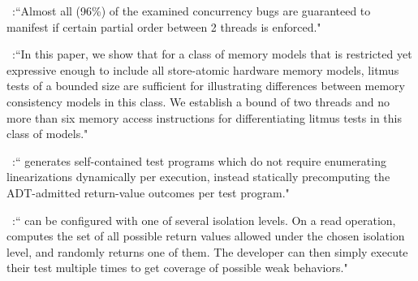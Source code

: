 ~\cite{Mistakes:ASPLOS2008}:``Almost all (96\%) of the examined concurrency bugs 
are guaranteed to manifest 
if certain partial order between 2 threads is enforced."

~\cite{Bounds:DAC2011}:``In this paper, we show that for a class of memory models 
that is restricted yet expressive enough
to include all store-atomic hardware memory models, 
litmus tests of a bounded size are sufficient for 
illustrating differences between memory consistency models in this class.
We establish a bound of two threads and 
no more than six memory access instructions 
for differentiating litmus tests
in this class of models."

\violat~\cite{Violat:CAV2019}:``\violat{} generates self-contained test programs which do
not require enumerating linearizations dynamically per execution, instead statically
precomputing the ADT-admitted return-value outcomes per test program."

\monkeydb~\cite{MonkeyDB:OOPSLA2021}:``\monkeydb{} can be configured with one of several isolation levels.
On a read operation, \monkeydb{} computes the set of all possible return values
allowed under the chosen isolation level,
and randomly returns one of them.
The developer can then simply execute their test multiple times
to get coverage of possible weak behaviors."
